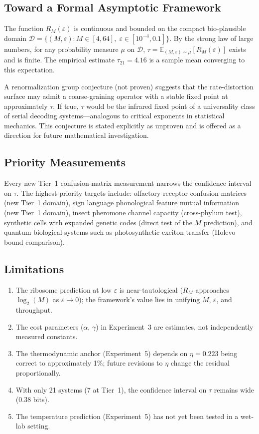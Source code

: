 \documentclass[12pt,a4paper]{article}
\begin{document}
\subsection{Toward a Formal Asymptotic Framework}

The function $R_M(\varepsilon)$ is continuous and bounded on the compact bio-plausible domain $\mathcal{D} = \{(M, \varepsilon) : M \in [4, 64],\; \varepsilon \in [10^{-4}, 0.1]\}$. By the strong law of large numbers, for any probability measure $\mu$ on $\mathcal{D}$, $\tau = \mathbb{E}_{(M,\varepsilon)\sim\mu}[R_M(\varepsilon)]$ exists and is finite. The empirical estimate $\tau_{21} = 4.16$ is a sample mean converging to this expectation.

A renormalization group conjecture (not proven) suggests that the rate-distortion surface may admit a coarse-graining operator with a stable fixed point at approximately $\tau$. If true, $\tau$ would be the infrared fixed point of a universality class of serial decoding systems---analogous to critical exponents in statistical mechanics. This conjecture is stated explicitly as unproven and is offered as a direction for future mathematical investigation.

\subsection{Priority Measurements}

Every new Tier~1 confusion-matrix measurement narrows the confidence interval on $\tau$. The highest-priority targets include: olfactory receptor confusion matrices (new Tier~1 domain), sign language phonological feature mutual information (new Tier~1 domain), insect pheromone channel capacity (cross-phylum test), synthetic cells with expanded genetic codes (direct test of the $M$ prediction), and quantum biological systems such as photosynthetic exciton transfer (Holevo bound comparison).

\subsection{Limitations}

\begin{enumerate}
\item The ribosome prediction at low $\varepsilon$ is near-tautological ($R_M$ approaches $\log_2(M)$ as $\varepsilon \to 0$); the framework's value lies in unifying $M$, $\varepsilon$, and throughput.
\item The cost parameters ($\alpha$, $\gamma$) in Experiment~3 are estimates, not independently measured constants.
\item The thermodynamic anchor (Experiment~5) depends on $\eta = 0.223$ being correct to approximately 1\%; future revisions to $\eta$ change the residual proportionally.
\item With only 21 systems (7 at Tier~1), the confidence interval on $\tau$ remains wide (0.38 bits).
\item The temperature prediction (Experiment~5) has not yet been tested in a wet-lab setting.
\end{enumerate}
\end{document}
